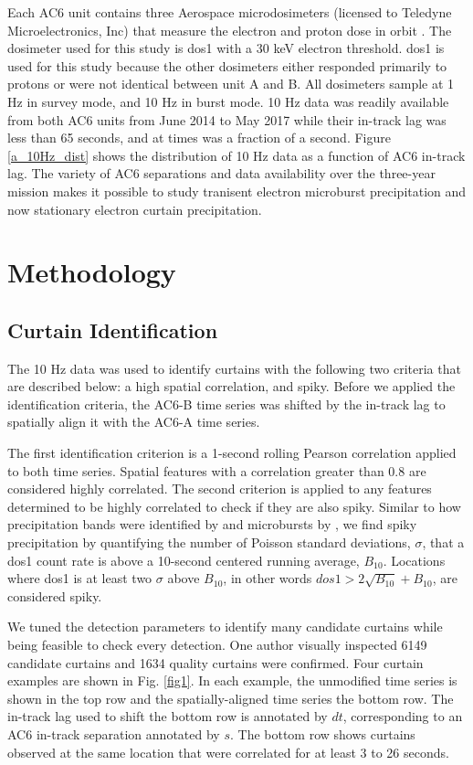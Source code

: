 \documentclass[draft]{agujournal2019}
\begin{document}
Each AC6 unit contains three Aerospace microdosimeters (licensed to Teledyne Microelectronics, Inc) that measure the electron and proton dose in orbit \cite{O'brien2016}. The dosimeter used for this study is dos1 with a $30$ keV electron threshold. dos1 is used for this study because the other dosimeters either responded primarily to protons or were not identical between unit A and B. All dosimeters sample at 1 Hz in survey mode, and 10 Hz in burst mode. 10 Hz data was readily available from both AC6 units from June 2014 to May 2017 while their in-track lag was less than 65 seconds, and at times was a fraction of a second. Figure \ref{a_10Hz_dist} shows the distribution of 10 Hz data as a function of AC6 in-track lag. The variety of AC6 separations and data availability over the three-year mission makes it possible to study tranisent electron microburst precipitation \cite{Shumko2020} and now stationary electron curtain precipitation.

\section{Methodology} 
\subsection{Curtain Identification} \label{curtain_identification}
The 10 Hz data was used to identify curtains with the following two criteria that are described below: a high spatial correlation, and spiky. Before we applied the identification criteria, the AC6-B time series was shifted by the in-track lag to spatially align it with the AC6-A time series. 

The first identification criterion is a 1-second rolling Pearson correlation applied to both time series. Spatial features with a correlation greater than 0.8 are considered highly correlated. The second criterion is applied to any features determined to be highly correlated to check if they are also spiky. Similar to how precipitation bands were identified by  and microbursts by , we find spiky precipitation by quantifying the number of Poisson standard deviations, $\sigma$, that a dos1 count rate is above a 10-second centered running average, $B_{10}$. Locations where dos1 is at least two $\sigma$ above $B_{10}$, in other words $dos1 > 2\sqrt{B_{10}} + B_{10}$, are considered spiky. 

We tuned the detection parameters to identify many candidate curtains while being feasible to check every detection. One author visually inspected 6149 candidate curtains and 1634 quality curtains were confirmed. Four curtain examples are shown in Fig. \ref{fig1}. In each example, the unmodified time series is shown in the top row and the spatially-aligned time series the bottom row. The in-track lag used to shift the bottom row is annotated by $dt$, corresponding to an AC6 in-track separation annotated by $s$. The bottom row shows curtains observed at the same location that were correlated for at least 3 to 26 seconds.
\end{document}
